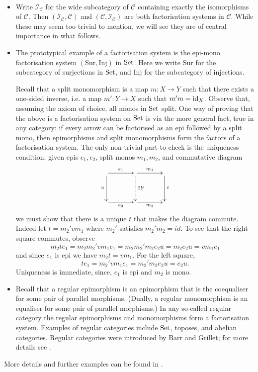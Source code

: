 \begin{examples} \label{ex.factsysts}\ 

  \begin{itemize}
    \item Write $\mathcal I_{\mathcal C}$ for the wide subcategory of
      $\mathcal C$ containing exactly the isomorphisms of $\mathcal C$. Then
      $(\mathcal I_{\mathcal C}, \mathcal C)$ and $(\mathcal C, \mathcal
      I_{\mathcal C})$ are both factorisation systems in $\mathcal C$. While
      these may seem too trivial to mention, we will see they are of central
      importance in what follows.
    
    \item The prototypical example of a factorisation system is the epi-mono
      factorisation system $(\mathrm{Sur},\mathrm{Inj})$ in $\mathrm{Set}$. Here we
      write $\mathrm{Sur}$ for the subcategory of surjections in $\mathrm{Set}$, and
      $\mathrm{Inj}$ for the subcategory of injections. 
      
      Recall that a split monomorphism is a map $m\colon X\to Y$ such that there
      exists a one-sided inverse, i.e. a map $m'\colon Y\to X$ such that
      $m'm=\mathrm{id}_X$. Observe that, assuming the axiom of choice, all monos in
      $\mathrm{Set}$ split.  One way of proving that the above is a factorisation system
      on $\mathrm{Set}$ is via the more general fact, true in any category: if every
      arrow can be factorised as an epi followed by a split mono, then
      epimorphisms and split monomorphisms form the factors of a factorisation
      system.  The only non-trivial part to check is the uniqueness condition:
      given epis $e_1,e_2$, split monos $m_1,m_2$, and commutative diagram
      \[
	\xymatrixcolsep{3pc}
	\xymatrixrowsep{3pc}
	\xymatrix{
	  \ar[r]^{e_1} \ar[d]_u & \ar[r]^{m_1} \ar@{.>}[d]^{\exists! t} &
	  \ar[d]^v \\
	  \ar[r]_{e_2}& \ar[r]_{m_2} & 
	}
      \]
      we must show that there is a unique $t$ that makes the diagram commute.
      Indeed let $t= m_2'vm_1$ where $m_2'$ satisfies $m_2'm_2=id$. 
      To see that the right square commutes, observe
      \[
	m_2 t e_1 =  m_2 m_2' v m_1 e_1 = m_2 m_2' m_2 e_2 u = m_2 e_2 u = v m_1 e_1
      \]
      and since $e_1$ is epi we have $m_2 t = v m_1$. For the left square,
      \[
	t e_1 = m_2' v m_1 e_1 = m_2' m_2 e_2 u = e_2 u.
      \] 
      Uniqueness is immediate, since, $e_1$ is epi and $m_2$ is mono. 
    
    \item Recall that a regular epimorphism is an epimorphism that is the
      coequaliser for some pair of parallel morphisms. (Dually, a regular
      monomorphism is an equaliser for some pair of parallel morphisms.) In any
      so-called regular category the regular epimorphisms and monomorphisms form
      a factorisation system.  Examples of regular categories include $\mathrm{Set}$,
      toposes, and abelian categories. Regular categories were introduced by
      Barr and Grillet; for more details see \cite{Bar71,Gri71}.
\end{itemize}
More details and further examples can be found in \cite[]{AHS}.
\end{examples}

